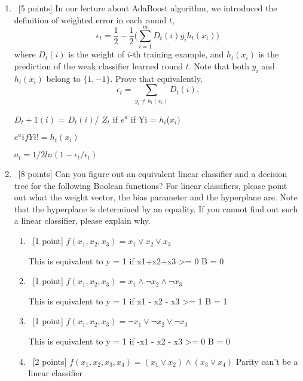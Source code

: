 \documentclass[12pt, fullpage,letterpaper]{article}
\begin{document}
\begin{enumerate}
\begin{enumerate}
\end{enumerate}

\item~[5 points] In our lecture about AdaBoost algorithm, we introduced the definition of weighted error in each round $t$, 
\[
\epsilon_t = \frac{1}{2} - \frac{1}{2}\big(\sum_{i=1}^m D_t(i) y_i h_t(x_i)\big)
\]
where $D_t(i)$ is the weight of $i$-th training example, and $h_t(x_i)$ is the prediction of the weak classifier learned round $t$. Note that both $y_i$ and $h_t(x_i)$ belong to $\{1, -1\}$. Prove that equivalently,
\[
\epsilon_t = \sum_{y_i \neq h_t(x_i)} D_t(i).
\]

$D_t+1(i)$ = $D_t(i)$/ $Z_t$ if $e^a$ if Yi = $h_i$($x_i)$

$e^a if Yi != h_t(x_i)$

$a_t = 1/2 ln(1-\epsilon_t/\epsilon_t)$

	\item~[8 points] Can you figure out an equivalent linear classifier and a decision tree for the following Boolean functions? For linear classifiers, please point out what the weight vector, the bias parameter and the hyperplane are. Note that the hyperplane is determined by an equality. If you cannot find out such a  linear classifier, please explain why. \newline



	\begin{enumerate}
		\item~[1 point] $f(x_1, x_2, x_3) = x_1 \lor x_2 \lor x_3$ \newline

This is equivalent to y = 1 if x1+x2+x3 >= 0
B = 0

		\item~[1 point] $f(x_1, x_2, x_3) = x_1 \land \neg x_2 \land \neg x_3$ \newline

This is equivalent to y = 1 if x1 - x2 - x3 >= 1
B = 1

		\item~[1 point] $f(x_1, x_2, x_3) = \neg x_1 \lor \neg x_2 \lor \neg x_3$  \newline

This is equivalent to y = 1 if -x1 - x2 - x3 >= 0
B = 0


		\item~[2 points] $f(x_1, x_2, x_3, x_4) = (x_1 \lor x_2) \land (x_3 \lor x_4)$ \newline
Parity can't be a linear classifier


\end{enumerate}
\end{enumerate}
\end{document}
